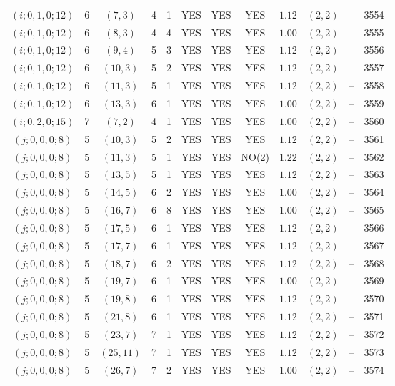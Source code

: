 \begin{longtable}{|c|c|c|c|c|c|c|c|c|c|c|c|}
$(i;0,1,0;12)$ & 6 & $(7,3)$ & 4 & 1 & YES & YES & YES & $1.12$ & $(2,2)$ & -- & 3554\\
$(i;0,1,0;12)$ & 6 & $(8,3)$ & 4 & 4 & YES & YES & YES & $1.00$ & $(2,2)$ & -- & 3555\\
$(i;0,1,0;12)$ & 6 & $(9,4)$ & 5 & 3 & YES & YES & YES & $1.12$ & $(2,2)$ & -- & 3556\\
$(i;0,1,0;12)$ & 6 & $(10,3)$ & 5 & 2 & YES & YES & YES & $1.12$ & $(2,2)$ & -- & 3557\\
$(i;0,1,0;12)$ & 6 & $(11,3)$ & 5 & 1 & YES & YES & YES & $1.12$ & $(2,2)$ & -- & 3558\\
$(i;0,1,0;12)$ & 6 & $(13,3)$ & 6 & 1 & YES & YES & YES & $1.00$ & $(2,2)$ & -- & 3559\\
$(i;0,2,0;15)$ & 7 & $(7,2)$ & 4 & 1 & YES & YES & YES & $1.00$ & $(2,2)$ & -- & 3560\\
$(j;0,0,0;8)$ & 5 & $(10,3)$ & 5 & 2 & YES & YES & YES & $1.12$ & $(2,2)$ & -- & 3561\\
$(j;0,0,0;8)$ & 5 & $(11,3)$ & 5 & 1 & YES & YES & NO(2) & $1.22$ & $(2,2)$ & -- & 3562\\
$(j;0,0,0;8)$ & 5 & $(13,5)$ & 5 & 1 & YES & YES & YES & $1.12$ & $(2,2)$ & -- & 3563\\
$(j;0,0,0;8)$ & 5 & $(14,5)$ & 6 & 2 & YES & YES & YES & $1.00$ & $(2,2)$ & -- & 3564\\
$(j;0,0,0;8)$ & 5 & $(16,7)$ & 6 & 8 & YES & YES & YES & $1.00$ & $(2,2)$ & -- & 3565\\
$(j;0,0,0;8)$ & 5 & $(17,5)$ & 6 & 1 & YES & YES & YES & $1.12$ & $(2,2)$ & -- & 3566\\
$(j;0,0,0;8)$ & 5 & $(17,7)$ & 6 & 1 & YES & YES & YES & $1.12$ & $(2,2)$ & -- & 3567\\
$(j;0,0,0;8)$ & 5 & $(18,7)$ & 6 & 2 & YES & YES & YES & $1.12$ & $(2,2)$ & -- & 3568\\
$(j;0,0,0;8)$ & 5 & $(19,7)$ & 6 & 1 & YES & YES & YES & $1.00$ & $(2,2)$ & -- & 3569\\
$(j;0,0,0;8)$ & 5 & $(19,8)$ & 6 & 1 & YES & YES & YES & $1.12$ & $(2,2)$ & -- & 3570\\
$(j;0,0,0;8)$ & 5 & $(21,8)$ & 6 & 1 & YES & YES & YES & $1.12$ & $(2,2)$ & -- & 3571\\
$(j;0,0,0;8)$ & 5 & $(23,7)$ & 7 & 1 & YES & YES & YES & $1.12$ & $(2,2)$ & -- & 3572\\
$(j;0,0,0;8)$ & 5 & $(25,11)$ & 7 & 1 & YES & YES & YES & $1.12$ & $(2,2)$ & -- & 3573\\
$(j;0,0,0;8)$ & 5 & $(26,7)$ & 7 & 2 & YES & YES & YES & $1.00$ & $(2,2)$ & -- & 3574\\

\end{longtable}
